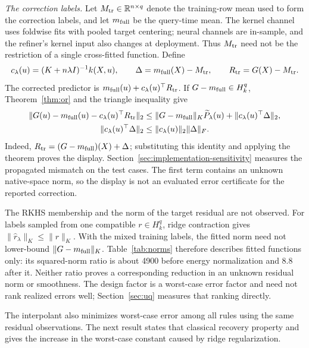 \documentclass[twoside,11pt]{article}
\begin{document}
\par\emph{The correction labels.}
Let $M_{\rm tr}\in\mathbb R^{n\times q}$ denote the training-row mean used to form the correction labels, and let $m_{\rm full}$ be the query-time mean. The kernel channel uses foldwise fits with pooled target centering; neural channels are in-sample, and the refiner's kernel input also changes at deployment. Thus $M_{\rm tr}$ need not be the restriction of a single cross-fitted function. Define
\[
 c_\lambda(u)=(K+n\lambda I)^{-1}k(X,u),\qquad
 \Delta=m_{\rm full}(X)-M_{\rm tr},\qquad
 R_{\rm tr}=G(X)-M_{\rm tr}.
\]
The corrected predictor is $m_{\rm full}(u)+c_\lambda(u)^\top R_{\rm tr}$. If $G-m_{\rm full}\in H_k^q$, Theorem~\ref{thm:or} and the triangle inequality give
\begin{align}
\|G(u)-m_{\rm full}(u)-c_\lambda(u)^\top R_{\rm tr}\|_2
&\le \|G-m_{\rm full}\|_K\widetilde P_\lambda(u)
       +\|c_\lambda(u)^\top\Delta\|_2,\label{eq:mismatch}\\
\|c_\lambda(u)^\top\Delta\|_2&\le\|c_\lambda(u)\|_2\|\Delta\|_F.\nonumber
\end{align}
Indeed, $R_{\rm tr}=(G-m_{\rm full})(X)+\Delta$; substituting this identity and applying the theorem proves the display. Section~\ref{sec:implementation-sensitivity} measures the propagated mismatch on the test cases. The first term contains an unknown native-space norm, so the display is not an evaluated error certificate for the reported correction.

The RKHS membership and the norm of the target residual are not observed. For labels sampled from one compatible $r\in H_k^q$, ridge contraction gives $\|\widehat r_\lambda\|_K\le\|r\|_K$. With the mixed training labels, the fitted norm need not lower-bound $\|G-m_{\rm full}\|_K$. Table~\ref{tab:norms} therefore describes fitted functions only: its squared-norm ratio is about 4900 before energy normalization and 8.8 after it. Neither ratio proves a corresponding reduction in an unknown residual norm or smoothness. The design factor is a worst-case error factor and need not rank realized errors well; Section~\ref{sec:uq} measures that ranking directly.

The interpolant also minimizes worst-case error among all rules using the
same residual observations. The next result states that classical recovery
property and gives the increase in the worst-case constant caused by ridge
regularization.
\end{document}

